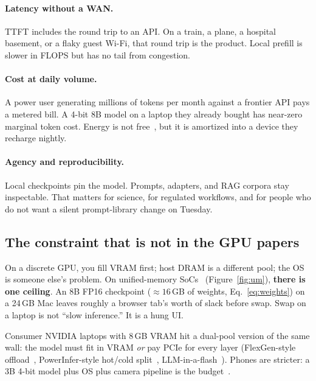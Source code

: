 \paragraph{Latency without a WAN.}
TTFT includes the round trip to an API. On a train, a plane, a hospital basement, or a flaky guest Wi-Fi, that round trip is the product. Local prefill is slower in FLOPS but has no tail from congestion.

\paragraph{Cost at daily volume.}
A power user generating millions of tokens per month against a frontier API pays a metered bill. A 4-bit 8B model on a laptop they already bought has near-zero marginal token cost. Energy is not free~\citep{luccioni2024power,patterson2021carbon}, but it is amortized into a device they recharge nightly.

\paragraph{Agency and reproducibility.}
Local checkpoints pin the model. Prompts, adapters, and RAG corpora stay inspectable. That matters for science, for regulated workflows, and for people who do not want a silent prompt-library change on Tuesday.

\subsection{The constraint that is not in the GPU papers}

On a discrete GPU, you fill VRAM first; host DRAM is a different pool; the OS is someone else's problem. On unified-memory SoCs~\citep{apple2020silicon} (Figure~\ref{fig:um}), \textbf{there is one ceiling}. An 8B FP16 checkpoint ($\approx 16$\,GB of weights, Eq.~\eqref{eq:weights}) on a 24\,GB Mac leaves roughly a browser tab's worth of slack before swap. Swap on a laptop is not ``slow inference.'' It is a hung UI.

Consumer NVIDIA laptops with 8\,GB VRAM hit a dual-pool version of the same wall: the model must fit in VRAM \emph{or} pay PCIe for every layer (FlexGen-style offload~\citep{sheng2023flexgen}, PowerInfer-style hot/cold split~\citep{song2024powerinfer}, LLM-in-a-flash~\citep{alizadeh2024llm}). Phones are stricter: a 3B 4-bit model plus OS plus camera pipeline is the budget~\citep{abdin2024phi3,gunter2024apple}.

